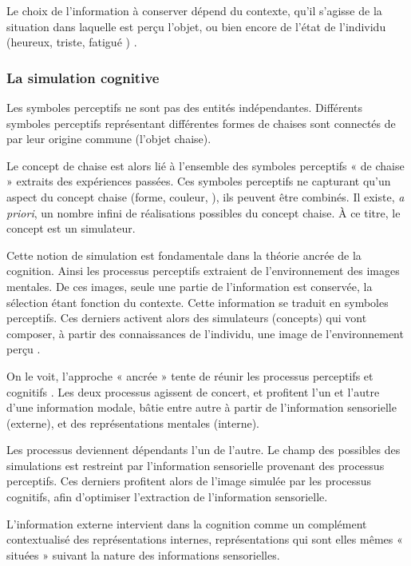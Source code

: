 Le choix de l'information à conserver dépend du contexte, qu'il s'agisse de la situation dans laquelle est perçu l'objet, ou bien encore de l'état de l'individu (heureux, triste, fatigué \etc) \citep{barsalou2003situated}.

\subsubsection{La simulation cognitive}

Les symboles perceptifs ne sont pas des entités indépendantes. Différents symboles perceptifs représentant différentes formes de chaises sont connectés de par leur origine commune (l'objet chaise).
 
Le concept de chaise est alors lié à l'ensemble des symboles perceptifs « de chaise » extraits des expériences passées. Ces symboles perceptifs ne capturant qu'un aspect du concept chaise (forme, couleur, \etc), ils peuvent être combinés. Il existe, \emph{a priori}, un nombre infini de réalisations possibles du concept chaise. À ce titre, le concept est un simulateur.

Cette notion de simulation est fondamentale dans la théorie ancrée de la cognition. Ainsi les processus perceptifs extraient de l'environnement des images mentales. De ces images, seule une partie de l'information est conservée, la sélection étant fonction du contexte. Cette information se traduit en symboles perceptifs. Ces derniers activent alors des simulateurs (concepts) qui vont composer, à partir des connaissances de l'individu, une image de l'environnement perçu \citep{barsalou2003situated}.

On le voit, l'approche « ancrée » tente de réunir les processus perceptifs et cognitifs \citep{goldstone1998reuniting}. Les deux processus agissent de concert, et profitent l'un et l'autre d'une information modale, bâtie entre autre à partir de l'information sensorielle (externe), et des représentations mentales (interne).

Les processus deviennent dépendants l'un de l'autre. Le champ des possibles des simulations est restreint par l'information sensorielle provenant des processus perceptifs. Ces derniers profitent alors de l'image simulée par les processus cognitifs, afin d'optimiser l'extraction de l'information sensorielle.

L'information externe intervient dans la cognition comme un complément contextualisé des représentations internes, représentations qui sont elles mêmes « situées » suivant la nature des informations sensorielles.

